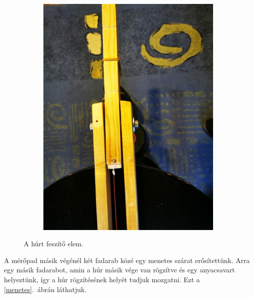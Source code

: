 \documentclass[a4paper,12pt]{article}
\begin{document}
\begin{figure}[h!]
\begin{subfigure}[t]{.4\linewidth}
\includegraphics[width=\linewidth]{eleje.jpg}
\end{subfigure}
\caption{A húrt feszítő elem.}
\label{erokar}
\end{figure}

A mérőpad másik végénél két fadarab közé egy menetes szárat erősítettünk. Arra egy másik fadarabot, amin a húr másik vége van rögzítve és egy anyacsavart helyeztünk, így a húr rögzítésének helyét tudjuk mozgatni. Ezt a \ref{menetes}.\ ábrán láthatjuk.
\end{document}
